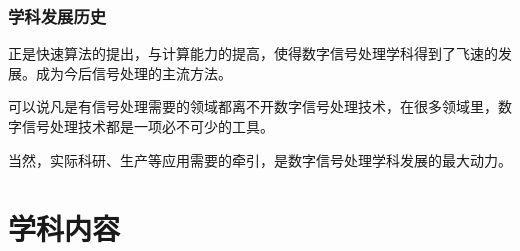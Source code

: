 \documentclass[notheorems,compress,mathserif,table]{beamer}
\begin{document}
%
%
%
%
%
%
\begin{frame}[shrink]\frametitle{  学科发展历史 }%

正是快速算法的提出，与计算能力的提高，使得数字信号处理学科得到了飞速的发展。成为今后信号处理的主流方法。


可以说凡是有信号处理需要的领域都离不开数字信号处理技术，在很多领域里，数字信号处理技术都是一项必不可少的工具。


当然，实际科研、生产等应用需要的牵引，是数字信号处理学科发展的最大动力。


\end{frame}

\section{学科内容}
\end{document}
